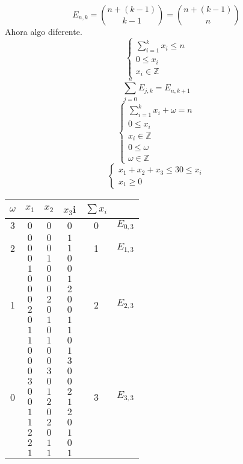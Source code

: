 \documentclass[../main.tex]{subfiles}
\begin{document}
\begin{figure}[H]
	\centering
	
\end{figure}
\[
	E_{n,k}=\binom{n+(k-1)}{k-1} = \binom{n+(k-1)}{n}
\]
Ahora algo diferente.
\[
	\begin{cases}
		\sum^k_{i=1}x_i\leq n\\
		0 \leq x_i\\
		x_i\in \mathbb{Z}
	\end{cases}
\]
\[
	\sum^n_{j=0}E_{j,k}=E_{n,k+1}
\]
\[
	\begin{cases}
		\sum^k_{i=1}x_i+\omega= n\\
		0 \leq x_i\\
		x_i\in \mathbb{Z}\\
		0 \leq \omega\\
		\omega \in \mathbb{Z}
	\end{cases}
\]
\[
	\begin{cases}
		x_1+x_2+x_3\leq 3
		0 \leq x_i\\
		x_1 \geq 0
	\end{cases}
\]
\begin{center}
	\begin{tabular}{c|c|c|c|c|c}
		$\omega$ & $x_1$ & $x_2$ & $x_3$i & $\sum x_i$\\
		\hline
		$3$ &$0$ & $0$ & $0$ & $0$ & $E_{0,3}$\\
		\hline
		\multirow{3}{*}{2} & $0$ &$0$ & $1$ & \multirow{3}{*}{1} & \multirow{3}{*}{$E_{1,3}$}\\
		&$0$ & $0$ & $1$ &\\
		&$0$ & $1$ & $0$ &\\
		&$1$ & $0$ & $0$ &\\
		\hline
		\multirow{6}{*}{1} & $0$ &$0$ & $1$ & \multirow{6}{*}{2} & \multirow{6}{*}{$E_{2,3}$}\\
		&$0$ & $0$ & $2$ &\\
		&$0$ & $2$ & $0$ &\\
		&$2$ & $0$ & $0$ &\\
		\cline{2-4}
		&$0$ & $1$ & $1$ &\\
		&$1$ & $0$ & $1$ &\\
		&$1$ & $1$ & $0$ &\\
		\hline
		\multirow{10}{*}{0} & $0$ &$0$ & $1$ & \multirow{10}{*}{3} & \multirow{10}{*}{$E_{3,3}$}\\
		&$0$ & $0$ & $3$ &\\
		&$0$ & $3$ & $0$ &\\
		&$3$ & $0$ & $0$ &\\
		\cline{2-4}
		&$0$ & $1$ & $2$ &\\
		&$0$ & $2$ & $1$ &\\
		&$1$ & $0$ & $2$ &\\
		&$1$ & $2$ & $0$ &\\
		&$2$ & $0$ & $1$ &\\
		&$2$ & $1$ & $0$ &\\
		\cline{2-4}
		&$1$ & $1$ & $1$ &\\
	\end{tabular}
\end{center}
\end{document}
